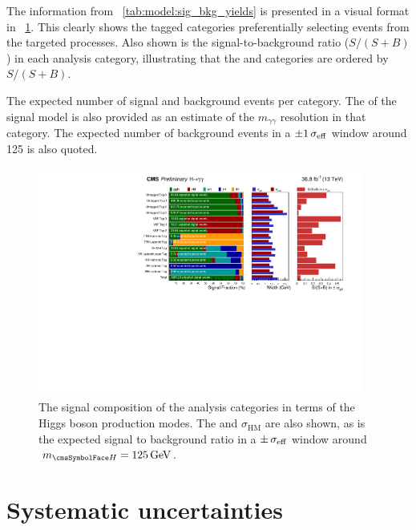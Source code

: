 The information from \Table~\ref{tab:model:sig_bkg_yields} is presented in a visual format in \Fig~\ref{fig:model:sig_table_visualisation}. This clearly shows the tagged categories preferentially selecting events from the targeted processes. Also shown is the signal-to-background ratio ($S/(S+B)$) in each analysis category, illustrating that the \Untagged and \VBFTag categories are ordered by $S/(S+B)$. 

 \begin{table}
  \resizebox{\textwidth}{!}{

}
 \caption{ The expected number of signal and background events per category. The \effSigma of the signal model is also provided as an estimate of the $m_{\gamma\gamma}$ resolution in that category. The expected number of background events in a $\pm 1 \,\sigma_{\text{eff}}$ window around 125 \GeV is also quoted.}
 \label{tab:model:sig_bkg_yields}
\end{table}

\begin{figure}
 \begin{center}
 \includegraphics[width=0.95\textwidth]{modellingFigures/yieldsTablePlot.pdf}
 \caption{The signal composition of the analysis categories in terms of the Higgs boson production modes. The \effSigma and $\sigma_{\text{HM}}$ are also shown, as is the expected signal to background ratio in a $\pm \,\sigma_{\text{eff}}$ window around $\mH=125\GeV$.} 
 \label{fig:model:sig_table_visualisation}
 \end{center}
\end{figure}

\section{Systematic uncertainties}
\label{model:sec:systematics}

